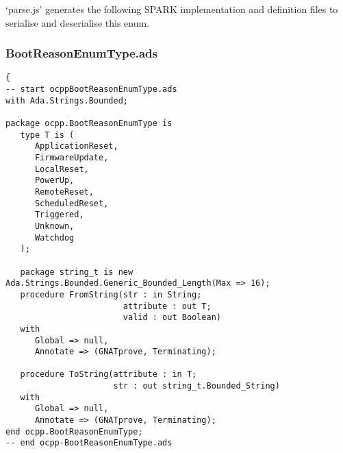 \documentclass[12pt,openany,a4paper]{book}
\begin{document}
`parse.js' generates the following SPARK implementation and definition files to serialise and deserialise this enum.

\subsubsection{BootReasonEnumType.ads}
\begin{verbatim}
{
-- start ocppBootReasonEnumType.ads
with Ada.Strings.Bounded;

package ocpp.BootReasonEnumType is
   type T is (
      ApplicationReset,
      FirmwareUpdate,
      LocalReset,
      PowerUp,
      RemoteReset,
      ScheduledReset,
      Triggered,
      Unknown,
      Watchdog
   );

   package string_t is new Ada.Strings.Bounded.Generic_Bounded_Length(Max => 16);
   procedure FromString(str : in String;
                        attribute : out T;
                        valid : out Boolean)
   with
      Global => null,
      Annotate => (GNATprove, Terminating);
 
   procedure ToString(attribute : in T;
                      str : out string_t.Bounded_String)
   with
      Global => null,
      Annotate => (GNATprove, Terminating);
end ocpp.BootReasonEnumType;
-- end ocpp-BootReasonEnumType.ads
\end{verbatim}
\end{document}
